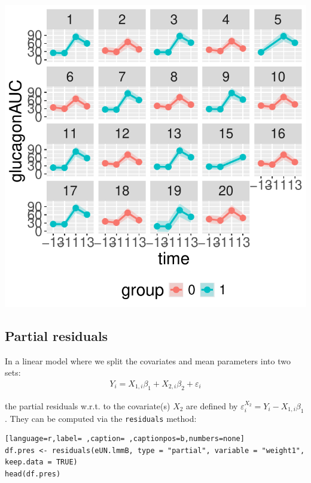 \documentclass[12pt]{article}
\begin{document}
\begin{minipage}{0.3\linewidth}
\begin{center}
\includegraphics[width=\textwidth]{./figures/fit-autoplot-indiv.pdf}
\end{center}
\end{minipage}

\clearpage

\subsection{Partial residuals}
\label{sec:org687c437}

In a linear model where we split the covariates and mean parameters into two sets:
\begin{align*}
Y_i = X_{1,i} \beta_1 + X_{2,i} \beta_2 + \varepsilon_i
\end{align*}

\noindent the partial residuals w.r.t. to the covariate(s) \(X_2\) are defined
by \(\varepsilon^{X_2}_{i} = Y_i - X_{1,i} \beta_1\). \newline They can be
computed via the \texttt{residuals} method:
\begin{lstlisting}[language=r,label= ,caption= ,captionpos=b,numbers=none]
df.pres <- residuals(eUN.lmmB, type = "partial", variable = "weight1", keep.data = TRUE)
head(df.pres)
\end{lstlisting}
\end{document}
